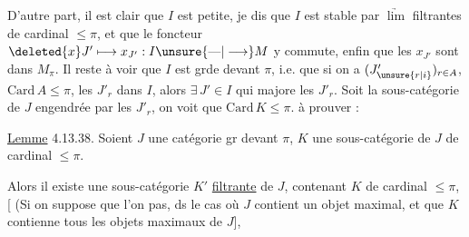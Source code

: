 D'autre part, il est clair que $I$ est petite, je dis que $I$ est stable par $\underrightarrow{\lim}$ filtrantes de cardinal $\leq\pi$, et que le foncteur $\deleted{x}J'\longmapsto x_{J'}:I\unsure{\text{---}|\longrightarrow}M$ y commute, enfin que les $x_{J'}$ sont dans $M_\pi$. Il reste à voir que $I$ est grde devant $\pi$, i.e. que  si on a $(J'_{\unsure{r|i}})_{r\in A}$,  $\mathrm{Card}\,A\leq\pi$, les $J'_r$ dans $I$, alors $\exists\,J'\in I$ qui majore les $J'_r$. Soit    la sous-catégorie  de $J$ engendrée par les $J'_r$, on voit    que $\mathrm{Card}\,K\leq\pi$.  à prouver :

\uline{Lemme} 4.13.38. Soient $J$ une catégorie gr devant $\pi$, $K$ une sous-catégorie de $J$  de cardinal $\leq\pi$.

Alors il existe une sous-catégorie $K'$  \uline{filtrante} de $J$, contenant $K$ de cardinal $\leq\pi$, [   (Si on suppose que l'on  pas,  ds le cas où $J$ contient un objet maximal, et que $K$ contienne tous les objets maximaux de $J$],
